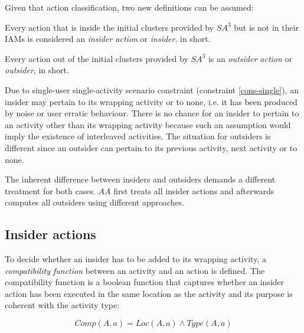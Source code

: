 Given that action classification, two new definitions can be assumed:

\begin{defn}
\label{def-insider}
 Every action that is inside the initial clusters provided by $SA^3$ but is not in their IAMs is considered an \textit{insider action} or \textit{insider}, in short.
\end{defn}

\begin{defn}
\label{def-outsider}
 Every action out of the initial clusters provided by $SA^3$ is an \textit{outsider action} or \textit{outsider}, in short.
\end{defn}

Due to single-user single-activity scenario constraint (constraint \ref{cons-single}), an insider may pertain to its wrapping activity or to none, i.e. it has been produced by noise or user erratic behaviour. There is no chance for an insider to pertain to an activity other than its wrapping activity because such an assumption would imply the existence of interleaved activities. The situation for outsiders is different since an outsider can pertain to its previous activity, next activity or to none. 

The inherent difference between insiders and outsiders demands a different treatment for both cases. $AA$ first treats all insider actions and afterwards computes all outsiders using different approaches.

\subsection{Insider actions}
To decide whether an insider has to be added to its wrapping activity, a \textit{compatibility function} between an activity and an action is defined. The compatibility function is a boolean function that captures whether an insider action has been executed in the same location as the activity and its purpose is coherent with the activity type:

\begin{equation}
\label{eq-comp}
 Comp(A, a) = Loc(A, a) \wedge Type(A, a)
\end{equation}


